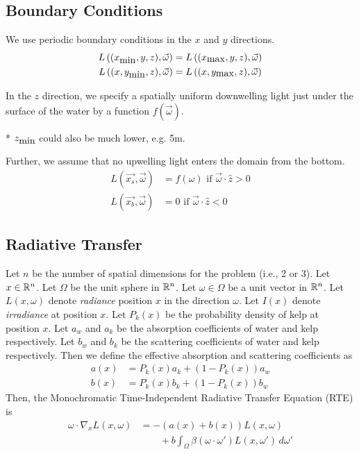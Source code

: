 \subsection{Boundary Conditions}

We use periodic boundary conditions in the $x$ and $y$ directions.
\begin{align}
  L\left((x_{\mbox{min}}, y, z), \vec{\omega}\right) &= L\left((x_{\mbox{max}}, y, z), \vec{\omega}\right) \\
  L\left((x, y_{\mbox{min}}, z), \vec{\omega}\right) &= L\left((x, y_{\mbox{max}}, z), \vec{\omega}\right)
\end{align}

In the $z$ direction, we specify a spatially uniform downwelling light just
under the surface of the water by a function $f(\vec{\omega})$.

* $z_{\mbox{min}}$ could also be much lower, e.g. 5m.

Further, we assume that no upwelling light enters the domain from the bottom.
\begin{align}
  L(\vec{x_s}, \vec{\omega}) &= f(\omega) \mbox{ if } \vec{\omega} \cdot \hat{z} > 0\\ 
  L(\vec{x_b}, \vec{\omega}) &= 0 \mbox { if } \vec{\omega} \cdot \hat{z} < 0
\end{align}
 

\subsection{Radiative Transfer}
Let $n$ be the number of spatial dimensions for the problem (i.e., 2 or 3).
Let $x \in \mathbb{R}^n$.
Let $\Omega$ be the unit sphere in $\mathbb{R}^n$.
Let $\omega \in \Omega$ be a unit vector in $\mathbb{R}^n$.
Let $L(x,\omega)$ denote \textit{radiance} position $x$ in the direction $\omega$.
Let $I(x)$ denote \textit{irradiance} at position $x$.
Let $P_k(x)$ be the probability density of kelp at position $x$.
Let $a_w$ and $a_k$ be the absorption coefficients of water and kelp respectively.
Let $b_w$ and $b_k$ be the scattering coefficients of water and kelp respectively.
Then we define the effective absorption and scattering coefficients as
\begin{align}
	\label{eq:abs}
	a(x) &= P_k(x) a_k + (1-P_k(x)) a_w \\
	\label{eq:sct}
	b(x) &= P_k(x) b_k + (1-P_k(x)) b_w
\end{align}
Then, the Monochromatic Time-Independent Radiative Transfer Equation (RTE) is
\begin{equation}
    \tag{RTE}
    \label{eq:rte}
    \begin{aligned}
        \omega \cdot \nabla_x L(x,\omega) &= -(a(x) + b(x)) L(x,\omega) \\
        &\qquad + b \int_\Omega \beta(\omega \cdot \omega') L(x,\omega')\, d\omega'
    \end{aligned}
\end{equation}

